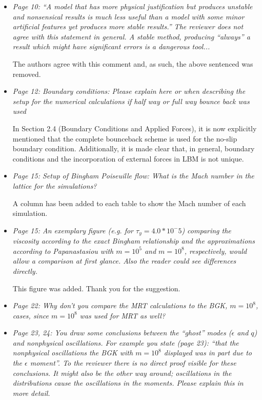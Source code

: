 \documentclass{article}
\begin{document}
\begin{itemize}
	\item \emph{Page 10: ``A model that has more physical justification but produces unstable and
		nonsensical results is much less useful than a model with some minor artificial
		features yet produces more stable results.'' The reviewer does not agree with this
		statement in general. A stable method, producing ``always'' a result which might have
		significant errors is a dangerous tool...}
	
	The authors agree with this comment and, as such, the above sentenced was removed.
	
	\item \emph{Page 12: Boundary conditions: Please explain here or when describing the setup for
		the numerical calculations if half way or full way bounce back was used}
	
	In Section 2.4 (Boundary Conditions and Applied Forces), it is now explicitly mentioned that the complete bounceback scheme is used for the no-slip boundary condition.
	Additionally, it is made clear that, in general, boundary conditions and the incorporation of external forces in LBM is not unique.
	
	\item \emph{Page 15: Setup of Bingham Poiseuille flow: What is the Mach number in the lattice
		for the simulations?}
	
	A column has been added to each table to show the Mach number of each simulation.
	
	\item \emph{Page 15: An exemplary figure (e.g. for $\tau_y = 4.0*10^-5$) comparing the viscosity
		according to the exact Bingham relationship and the approximations according to
		Papanastasiou with $m=10^5$ and $m=10^8$, respectively, would allow a comparison at
		first glance. Also the reader could see differences directly.}
	
	This figure was added.
	Thank you for the suggestion.
	
	\item \emph{Page 22: Why don’t you compare the MRT calculations to the BGK,
		$m=10^8$, cases, since $m=10^8$ was used for MRT as well?}
	
	\item \emph{Page 23, 24: You draw some conclusions between the ``ghost'' modes ($\epsilon$ and $q$) and
		nonphysical oscillations. For example you state (page 23): ``that the nonphysical
		oscillations the BGK with $m = 10^8$ displayed was in part due to the $\epsilon$ moment''.
		To the reviewer there is no direct proof visible for these conclusions. It might also be
		the other way around; oscillations in the distributions cause the oscillations in the
		moments. Please explain this in more detail.}
	

\end{itemize}
\end{document}
